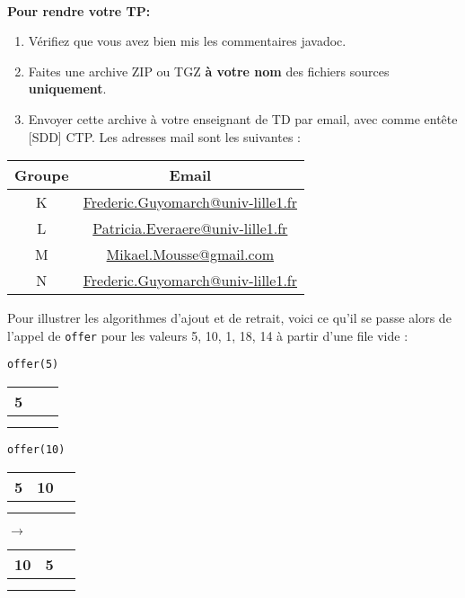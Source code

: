 \documentclass[iutinfo,10pt]{ustl-tdtp}
\begin{document}
~\\ \textbf{Pour rendre votre TP:} 
\begin{enumerate}
    \item Vérifiez que vous avez bien mis les commentaires javadoc.
    \item Faites une archive ZIP ou TGZ \textbf{à votre nom} des fichiers sources \textbf{uniquement}.
    \item Envoyer cette archive à votre enseignant de TD par email, avec comme entête [SDD] CTP. Les adresses mail sont les suivantes :
\end{enumerate}

\begin{center}
\begin{tabular}{|c|c|}
\hline
\textbf{Groupe}     &  \textbf{Email} \\
\hline
    K & \href{mailto:Frederic.Guyomarch@univ-lille1.fr?subject=[SDD] CTP K}{Frederic.Guyomarch@univ-lille1.fr} \\
    L & \href{mailto:Patricia.Everaere@univ-lille1.fr?subject=[SDD] CTP L}{Patricia.Everaere@univ-lille1.fr} \\
    M & \href{mailto:Mikael.Mousse@gmail.com?subject=[SDD] CTP M}{Mikael.Mousse@gmail.com} \\
    N & \href{mailto:Frederic.Guyomarch@univ-lille1.fr?subject=[SDD] CTP N}{Frederic.Guyomarch@univ-lille1.fr} \\
\hline
\end{tabular}
\end{center}

\newpage

Pour illustrer les algorithmes d'ajout et de retrait, voici ce qu'il se passe alors de l'appel de \texttt{offer} pour les valeurs 5, 10, 1, 18, 14 à partir d'une file vide :

\texttt{offer(5)}\\
\begin{tabular}{|c|c|c|}
\hline
   5 &  &  \\
\hline
     &  &  \\
\hline
     &  &  \\
\hline
\end{tabular}

\texttt{offer(10)}\\
\begin{tabular}{|c|c|c|}
\hline
   5 & 10 &  \\
\hline
     &  &  \\
\hline
     &  &  \\
\hline
\end{tabular}
$\rightarrow$
\begin{tabular}{|c|c|c|}
\hline
    10 & 5 &  \\
\hline
     &  &  \\
\hline
     &  &  \\
\hline
\end{tabular}
\end{document}
